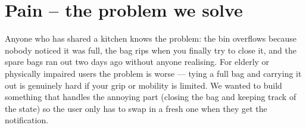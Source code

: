 \documentclass{article}
\begin{document}
\fi

\section{Pain -- the problem we solve}
\label{sec:pain}

Anyone who has shared a kitchen knows the problem: the bin overflows because nobody noticed it was full, the bag rips when you finally try to close it, and the spare bags ran out two days ago without anyone realising. For elderly or physically impaired users the problem is worse — tying a full bag and carrying it out is genuinely hard if your grip or mobility is limited. We wanted to build something that handles the annoying part (closing the bag and keeping track of the state) so the user only has to swap in a fresh one when they get the notification.


\ifdefined\mainfile\else
\end{document}
